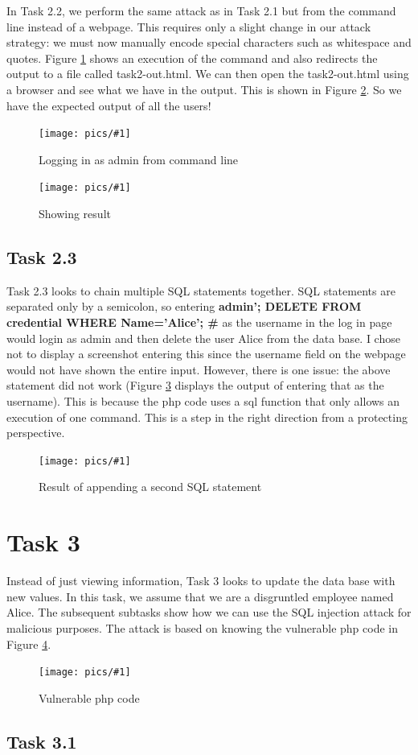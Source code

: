 \documentclass[11pt]{article}
\newcommand{\fig}[2]{ 
\begin{figure}[h]
	\centering
	\caption{#2}
	\texttt{[image: pics/\#1]}
	\label{fig:#1}
\end{figure} 
}
\begin{document}
In Task 2.2, we perform the same attack as in Task 2.1 but from the command line instead of a webpage. This requires only a slight change in our attack strategy: we must now manually encode special characters such as whitespace and quotes. Figure \ref{fig:task2.3} shows an execution of the command and also redirects the output to a file called task2-out.html. We can then open the task2-out.html using a browser and see what we have in the output. This is shown in Figure \ref{fig:task2.4}. So we have the expected output of all the users!

\fig{task2.3}{Logging in as admin from command line}

\fig{task2.4}{Showing result}

\subsection*{Task 2.3}

Task 2.3 looks to chain multiple SQL statements together. SQL statements are separated only by a semicolon, so entering {\bf admin'; DELETE FROM credential WHERE Name='Alice'; \#} as the username in the log in page would login as admin and then delete the user Alice from the data base. I chose not to display a screenshot entering this since the username field on the webpage would not have shown the entire input. However, there is one issue: the above statement did not work (Figure \ref{fig:task2.5} displays the output of entering that as the username). This is because the php code uses a sql function that only allows an execution of one command. This is a step in the right direction from a protecting perspective.

\fig{task2.5}{Result of appending a second SQL statement}

\newpage 

\section*{Task 3}

Instead of just viewing information, Task 3 looks to update the data base with new values. In this task, we assume that we are a disgruntled employee named Alice. The subsequent subtasks show how we can use the SQL injection attack for malicious purposes. The attack is based on knowing the vulnerable php code in Figure \ref{fig:task3.0}.

\fig{task3.0}{Vulnerable php code}

\subsection*{Task 3.1}
\end{document}
